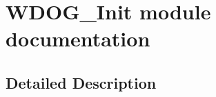 \hypertarget{group___w_d_o_g___init__module}{}\section{W\+D\+O\+G\+\_\+\+Init module documentation}
\label{group___w_d_o_g___init__module}


\subsection{Detailed Description}
